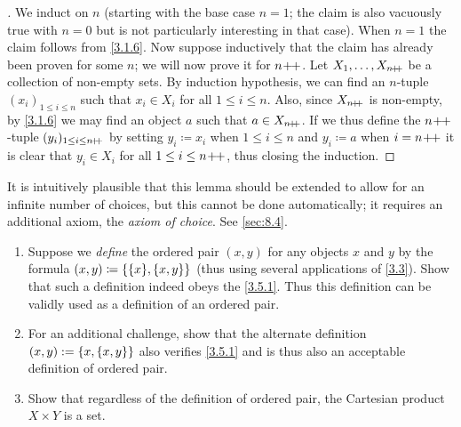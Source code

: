 \begin{proof}[]
	We induct on \(n\) (starting with the base case \(n = 1\); the claim is also vacuously true with \(n = 0\) but is not particularly interesting in that case).
	When \(n = 1\) the claim follows from \cref{3.1.6}.
	Now suppose inductively that the claim has already been proven for some \(n\);
	we will now prove it for \(n\!+\!\!+\).
	Let \(X_1, \dots, X_{n\!+\!\!+}\) be a collection of non-empty sets.
	By induction hypothesis, we can find an \(n\)-tuple \((x_i)_{1 \leq i \leq n}\) such that \(x_i \in X_i\) for all \(1 \leq i \leq n\).
	Also, since \(X_{n\!+\!\!+}\) is non-empty, by \cref{3.1.6} we may find an object \(a\) such that \(a \in X_{n\!+\!\!+}\).
	If we thus define the \(n\!+\!\!+\)-tuple \((y_i)_{1 \leq i \leq n\!+\!\!+}\) by setting \(y_i \coloneqq x_i\) when \(1 \leq i \leq n\) and \(y_i \coloneqq a\) when \(i = n\!+\!\!+\) it is clear that \(y_i \in X_i\) for all \(1 \leq i \leq n\!+\!\!+\), thus closing the induction.
\end{proof}

\begin{rmk}\label{3.5.13}
	It is intuitively plausible that this lemma should be extended to allow for an infinite number of choices, but this cannot be done automatically;
	it requires an additional axiom, the \emph{axiom of choice}.
	See \cref{sec:8.4}.
\end{rmk}

\exercisesection

\begin{ex}\label{ex:3.5.1}
	\begin{enumerate}
		\item Suppose we \emph{define} the ordered pair \((x, y)\) for any objects \(x\) and \(y\) by the formula \((x, y) \coloneqq \set{\set{x}, \set{x, y}}\)
		      (thus using several applications of \cref{3.3}).
		      Show that such a definition indeed obeys the \cref{3.5.1}.
		      Thus this definition can be validly used as a definition of an ordered pair.
		\item For an additional challenge, show that the alternate definition \((x, y) := \left\lbrace x, \left\lbrace x, y\right\rbrace\right\rbrace\) also verifies \cref{3.5.1} and is thus also an acceptable definition of ordered pair.
		\item Show that regardless of the definition of ordered pair, the Cartesian product \(X \times Y\) is a set.
	\end{enumerate}
\end{ex}


